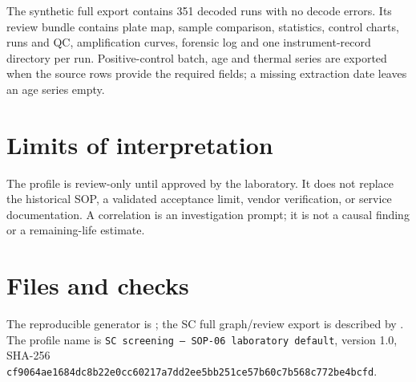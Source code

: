 The synthetic full export contains 351 decoded runs with no decode errors. Its review bundle contains plate map, sample comparison, statistics, control charts, runs and QC, amplification curves, forensic log and one instrument-record directory per run. Positive-control batch, age and thermal series are exported when the source rows provide the required fields; a missing extraction date leaves an age series empty.


\section{Limits of interpretation}
The profile is review-only until approved by the laboratory. It does not replace the historical SOP, a validated acceptance limit, vendor verification, or service documentation. A correlation is an investigation prompt; it is not a causal finding or a remaining-life estimate.

\section{Files and checks}
The reproducible generator is ; the SC full graph/review export is described by . The profile name is \texttt{SC screening -- SOP-06 laboratory default}, version 1.0, SHA-256 \texttt{cf9064ae1684dc8b22e0cc60217a7dd2ee5bb251ce57b60c7b568c772be4bcfd}.




